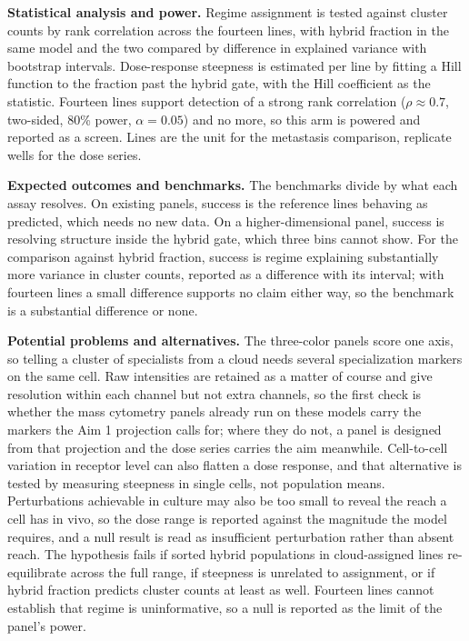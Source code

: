 \documentclass[12pt,letterpaper]{article}
\newcommand{\chg}[1]{\textcolor{chgcolor}{#1}}
\newcommand{\chg}[1]{#1}
\newcommand{\lead}[1]{\textbf{#1}}
\begin{document}
\lead{Statistical analysis and power.} Regime assignment is tested against cluster counts by rank correlation across the fourteen lines, with hybrid fraction in the same model and the two compared by difference in explained variance with bootstrap intervals. Dose-response steepness is estimated per line by fitting a Hill function to the fraction past the hybrid gate, with the Hill coefficient as the statistic. Fourteen lines support detection of a strong rank correlation ($\rho \approx 0.7$\chg{, two-sided, 80\% power, $\alpha=0.05$}) and no more, so this arm is powered and reported as a screen. Lines are the unit for the metastasis comparison, replicate wells for the dose series.

\lead{Expected outcomes and benchmarks.} The benchmarks divide by what each assay resolves. On existing panels, success is the reference lines behaving as predicted, which needs no new data. On a higher-dimensional panel, success is resolving structure inside the hybrid gate, which three bins cannot show. For the comparison against hybrid fraction, success is regime explaining substantially more variance in cluster counts, reported as a difference with its interval; with fourteen lines a small difference supports no claim either way, so the benchmark is a substantial difference or none.

\lead{Potential problems and alternatives.} The three-color panels score one axis, so telling a cluster of specialists from a cloud needs several specialization markers on the same cell. Raw intensities are retained as a matter of course and give resolution within each channel but not extra channels, so the first check is whether the mass cytometry panels already run on these models carry the markers the Aim 1 projection calls for; where they do not, a panel is designed from that projection and the dose series carries the aim meanwhile. Cell-to-cell variation in receptor level can also flatten a dose response, and that alternative is tested by measuring steepness in single cells, not population means. \chg{Perturbations achievable in culture may also be too small to reveal the reach a cell has in vivo, so the dose range is reported against the magnitude the model requires, and a null result is read as insufficient perturbation rather than absent reach.} The hypothesis fails if sorted hybrid populations in cloud-assigned lines re-equilibrate across the full range, if steepness is unrelated to assignment, or if hybrid fraction predicts cluster counts at least as well. Fourteen lines cannot establish that regime is uninformative, so a null is reported as the limit of the panel's power.
\end{document}

